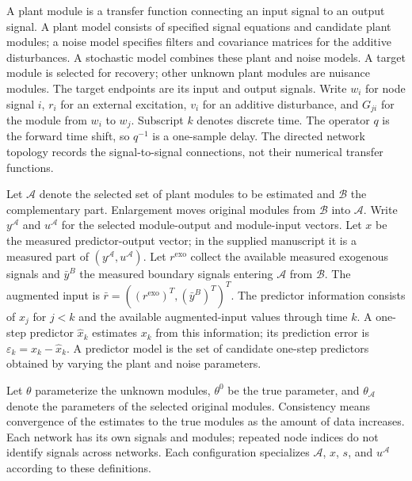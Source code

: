 \documentclass[11pt,a4paper]{article}
\newcommand{\Aset}{\mathcal A}
\begin{document}
A plant module is a transfer function connecting an input signal to an output signal.  A plant model consists of specified signal equations and candidate plant modules; a noise model specifies filters and covariance matrices for the additive disturbances.  A stochastic model combines these plant and noise models.  A target module is selected for recovery; other unknown plant modules are nuisance modules.  The target endpoints are its input and output signals.  Write $w_i$ for node signal $i$, $r_i$ for an external excitation, $v_i$ for an additive disturbance, and $G_{ji}$ for the module from $w_i$ to $w_j$.  Subscript $k$ denotes discrete time.  The operator $q$ is the forward time shift, so $q^{-1}$ is a one-sample delay.  The directed network topology records the signal-to-signal connections, not their numerical transfer functions.

Let $\Aset$ denote the selected set of plant modules to be estimated and $\mathcal B$ the complementary part.  Enlargement moves original modules from $\mathcal B$ into $\Aset$.  Write $y^{\Aset}$ and $u^{\Aset}$ for the selected module-output and module-input vectors.  Let $x$ be the measured predictor-output vector; in the supplied manuscript it is a measured part of $(y^{\Aset},u^{\Aset})$.  Let $r^{\mathrm{exo}}$ collect the available measured exogenous signals and $\bar y^B$ the measured boundary signals entering $\Aset$ from $\mathcal B$.  The augmented input is $\bar r=((r^{\mathrm{exo}})^T,(\bar y^B)^T)^T$.  The predictor information consists of $x_j$ for $j<k$ and the available augmented-input values through time $k$.  A one-step predictor $\hat x_k$ estimates $x_k$ from this information; its prediction error is $\varepsilon_k=x_k-\hat x_k$.  A predictor model is the set of candidate one-step predictors obtained by varying the plant and noise parameters.

Let $\theta$ parameterize the unknown modules, $\theta^0$ be the true parameter, and $\theta_{\Aset}$ denote the parameters of the selected original modules.  Consistency means convergence of the estimates to the true modules as the amount of data increases.  Each network has its own signals and modules; repeated node indices do not identify signals across networks.  Each configuration specializes $\Aset$, $x$, $s$, and $u^{\Aset}$ according to these definitions.
\end{document}
